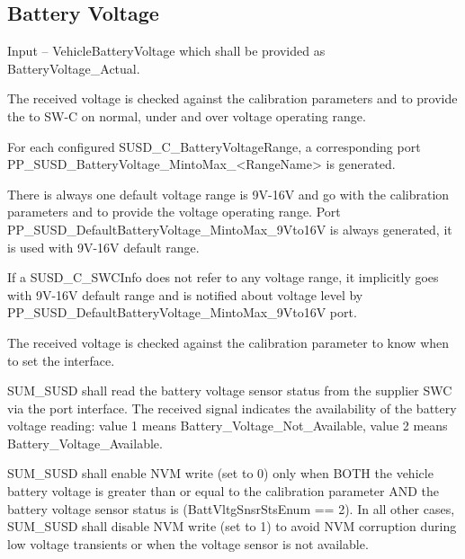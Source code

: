 \subsection{Battery Voltage}\label{subsec:battery_voltage}

{Input – VehicleBatteryVoltage which shall be provided as BatteryVoltage_Actual.

The received voltage is checked against the calibration parameters  and  to provide the  to SW-C on normal, under and over voltage operating range. \newline

For each configured SUSD_C_BatteryVoltageRange, a corresponding port PP_SUSD_BatteryVoltage_MintoMax_<RangeName> is generated. \newline

There is always one default voltage range is 9V-16V and go with the calibration parameters  and  to provide the voltage operating range.
Port PP_SUSD_DefaultBatteryVoltage_MintoMax_9Vto16V is always generated, it is used with 9V-16V default range. \newline

If a SUSD_C_SWCInfo does not refer to any voltage range, it implicitly goes with 9V-16V default range and is notified about voltage level by PP_SUSD_DefaultBatteryVoltage_MintoMax_9Vto16V port. \newline

The received voltage is checked against the calibration parameter  to know when to set the  interface.}
{     }

{SUM\_SUSD shall read the battery voltage sensor status from the supplier SWC via the  port interface. The received  signal indicates the availability of the battery voltage reading: value 1 means Battery\_Voltage\_Not\_Available, value 2 means Battery\_Voltage\_Available.}
{}

{SUM\_SUSD shall enable NVM write (set  to 0) only when BOTH the vehicle battery voltage is greater than or equal to the calibration parameter  AND the battery voltage sensor status is  (BattVltgSnsrStsEnum == 2). In all other cases, SUM\_SUSD shall disable NVM write (set  to 1) to avoid NVM corruption during low voltage transients or when the voltage sensor is not available.}
{}

